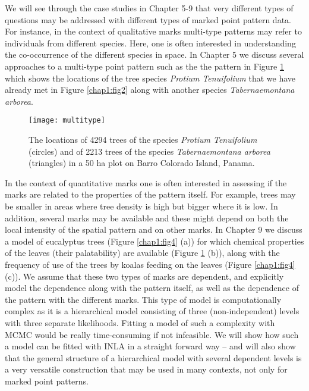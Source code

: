 We will see through the case studies in Chapter 5-9 that very different types of questions may be addressed with different types of marked point pattern data. For instance, in the context of qualitative marks multi-type patterns may refer to individuals from different species. Here, one is often interested in understanding the co-occurrence of the different species  in space.  In Chapter 5 we discuss several approaches to a multi-type point pattern such as the the pattern in  Figure \ref{chap1:fig3} which shows the locations of the tree species \textit{Protium Tenuifolium} that we have already met in  Figure \ref{chap1:fig2} along with another species \textit{Tabernaemontana arborea}.
\begin{figure}[h]
\begin{center}
\texttt{[image: multitype]}
\end{center}
\caption{The locations of 4294 trees of the species \textit{Protium Tenuifolium} (circles) and of 2213 trees of the species \textit{Tabernaemontana arborea} (triangles) in a 50 ha plot on Barro Colorado Island, Panama.}
\label{chap1:fig3}
\end{figure}

In the context of quantitative marks one is often interested in assessing if the marks are related to the properties of the pattern itself. For example, trees may be smaller in areas where tree density is high but bigger where it is low. In addition, several marks may be available and these might depend on both the local intensity of the spatial pattern and on other marks. In Chapter 9 we discuss a model of eucalyptus trees (Figure \ref{chap1:fig4} (a)) for which chemical properties of the leaves (their palatability) are available  (Figure \ref{chap1:fig3} (b)), along with the frequency of use of the trees by koalas feeding on the leaves (Figure \ref{chap1:fig4} (c)). We assume that these two types of marks are dependent, and explicitly model the dependence along with the pattern itself, as well as the dependence of the pattern with the different marks. This type of model is computationally complex as it is a hierarchical model consisting of three (non-independent) levels with three separate likelihoods. Fitting a model of such a complexity with MCMC would be really time-consuming if not infeasible. We will show how such a model can be fitted with INLA in a straight forward way -- and will also show that the general structure of a hierarchical model with several dependent levels is a very versatile construction that may be used in many contexts, not only for marked point patterns.

